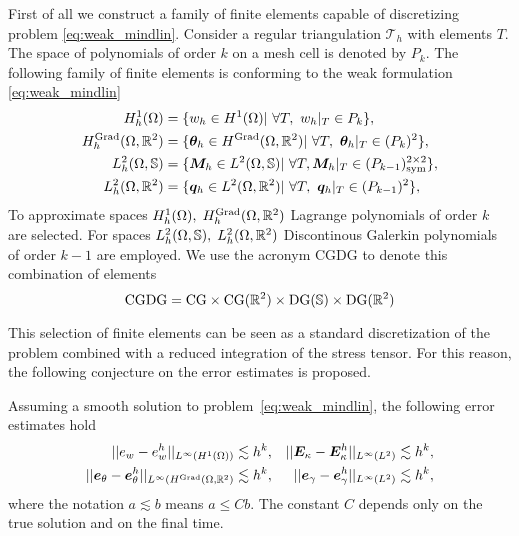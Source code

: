 First of all we construct a family of finite elements capable of discretizing problem \eqref{eq:weak_mindlin}. Consider a regular triangulation $\mathcal{T}_h$ with elements $T$. The space of polynomials of order $k$ on a mesh cell is denoted by $P_k$. The following family of finite elements is conforming to the weak formulation \eqref{eq:weak_mindlin}
\begin{equation}\label{eq:CGDG}
\begin{aligned}
H_{h}^{1}(\Omega) &= \{w_h \in H^1(\Omega) \vert \ \forall T, \ w_h|_{T} \in P_{k} \}, \\
H_h^{\Grad}(\Omega, \bbR^2) &= \{ \bm{\theta}_h \in H^{\Grad}(\Omega, \bbR^2) \vert \ \forall T,\ \bm{\theta}_h|_{T} \in (P_{k})^2 \}, \\
L_h^2(\Omega, \mathbb{S}) &= \{ \bm{M}_h \in L^2(\Omega, \mathbb{S}) \vert \ \forall T, \bm{M}_h|_{T} \in (P_{k-1})^{2 \times 2}_{\text{sym}} \}, \\
L_h^2(\Omega, \bbR^2) &= \{\bm{q}_h \in L^2(\Omega, \bbR^2)  \vert \ \forall T,\ \bm{q}_h|_{T} \in (P_{k-1})^{2} \}, \\
\end{aligned}
\end{equation}
To approximate spaces $H_h^{1}(\Omega), \; H_h^{\operatorname*{Grad}}(\Omega, \mathbb{R}^2)$ Lagrange polynomials of order $k$ are selected. For spaces $L_h^2(\Omega, \mathbb{S}), \; L_h^2(\Omega, \mathbb{R}^2)$ Discontinous Galerkin polynomials of order $k-1$ are employed. We use the acronym CGDG to denote this combination of elements
\[
\mathrm{CGDG} = \mathrm{CG} \times \mathrm{CG}(\mathbb{R}^2) \times \mathrm{DG}(\mathbb{S}) \times \mathrm{DG}(\mathbb{R}^2)
\]

This selection of finite elements can be seen as a standard discretization of the problem combined with a reduced integration of the stress tensor. For this reason, the following conjecture on the error estimates is proposed. 

\begin{conjecture}\label{conj:min}
	Assuming a smooth solution to problem~\eqref{eq:weak_mindlin}, the following error estimates hold 
	\begin{equation}
	\label{eq:errCGDG}
	\begin{aligned}
	||e_w - e_w^h||_{L^{\infty}(H^1(\Omega))} &\lesssim h^{k}, \\
	||\bm{e}_\theta - \bm{e}_\theta^h||_{L^{\infty}(H^{\operatorname*{Grad}}(\Omega, \mathbb{R}^2)} &\lesssim h^{k}, \\
	\end{aligned} \quad
	\begin{aligned}
	||\bm{E}_\kappa - \bm{E}_\kappa^h||_{L^{\infty}(L^2)} &\lesssim  h^{k}, \\
	||\bm{e}_\gamma - \bm{e}_\gamma^ h||_{L^{\infty}(L^2)} &\lesssim  h^{k}, \\
	\end{aligned} 
	\end{equation}
	where the notation $a \lesssim  b$ means $a \le C b$. The constant $C$ depends only on the true solution and on the final time.
\end{conjecture}

